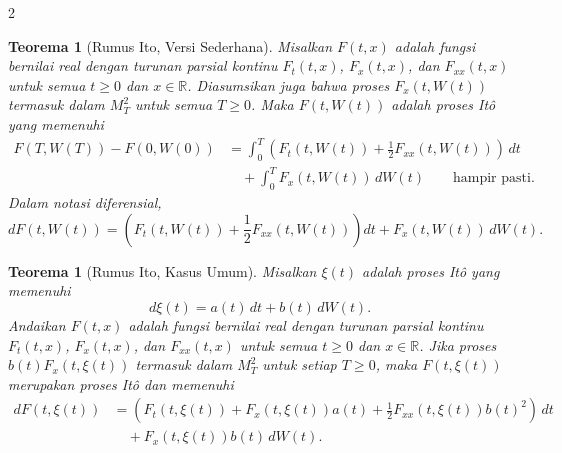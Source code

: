 \documentclass[a4paper,extrafontsizes, 9pt]{memoir}
\theoremstyle{definition}
\theoremstyle{plain}
\newtheorem{teorema}[kalstok]{Teorema}
\theoremstyle{remark}
\begin{document}
\begin{multicols}{2}
  \begin{teorema}[Rumus Ito, Versi Sederhana]
    Misalkan $F(t,x)$ adalah fungsi bernilai real dengan turunan parsial kontinu
    $F_t(t,x)$, $F_x(t,x)$, dan $F_{xx}(t,x)$ untuk semua $t\ge 0$ dan $x\in\mathbb{R}$.
    Diasumsikan juga bahwa proses $F_x(t,W(t))$ termasuk dalam $M_T^2$ untuk semua $T\ge 0$.
    Maka $F(t,W(t))$ adalah proses It\^o yang memenuhi
    \begin{align*}
      F(T,W(T))-F(0,W(0))
       & =
      \int_0^T \left(F_t(t,W(t))+\frac{1}{2}F_{xx}(t,W(t))\right)\,dt \\
       & \quad +
      \int_0^T F_x(t,W(t))\,dW(t)
      \qquad \text{hampir pasti}.
    \end{align*}
    Dalam notasi diferensial,
    \[dF(t,W(t))
      =\left(F_t(t,W(t))+\frac{1}{2}F_{xx}(t,W(t))\right)dt+F_x(t,W(t))\,dW(t).\]
  \end{teorema}

  \begin{teorema}[Rumus Ito, Kasus Umum]
    Misalkan $\xi(t)$ adalah proses It\^o yang memenuhi
    \[d\xi(t)=a(t)\,dt+b(t)\,dW(t).\]
    Andaikan $F(t,x)$ adalah fungsi bernilai real dengan turunan parsial kontinu
    $F_t(t,x)$, $F_x(t,x)$, dan $F_{xx}(t,x)$ untuk semua $t\ge 0$ dan $x\in\mathbb{R}$.
    Jika proses $b(t)F_x(t,\xi(t))$ termasuk dalam $M_T^2$ untuk setiap $T\ge 0$, maka
    $F(t,\xi(t))$ merupakan proses It\^o dan memenuhi
    \begin{align*}
      dF(t,\xi(t))
       & =
      \left(F_t(t,\xi(t))+F_x(t,\xi(t))a(t)+\frac{1}{2}F_{xx}(t,\xi(t))b(t)^2\right)\,dt \\
       & \quad +F_x(t,\xi(t))b(t)\,dW(t).
    \end{align*}
  \end{teorema}


\end{multicols}
\end{document}
